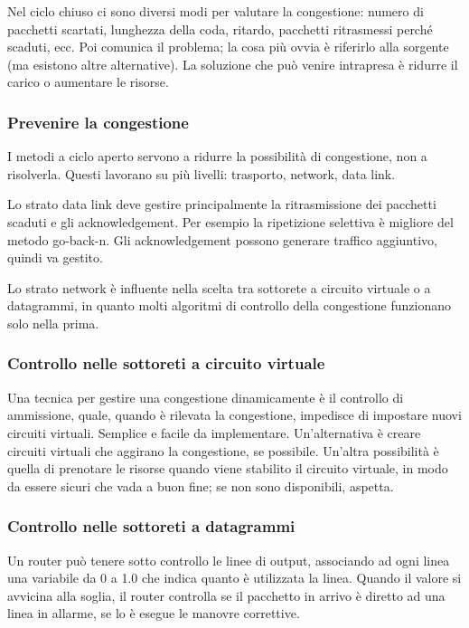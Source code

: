 Nel ciclo chiuso ci sono diversi modi per valutare la congestione: numero di pacchetti scartati, lunghezza della coda, ritardo, pacchetti ritrasmessi perché scaduti, ecc.
Poi comunica il problema; la cosa più ovvia è riferirlo alla sorgente (ma esistono altre alternative).
La soluzione che può venire intrapresa è ridurre il carico o aumentare le risorse.

\subsubsection{Prevenire la congestione}
I metodi a ciclo aperto servono a ridurre la possibilità di congestione, non a risolverla.
Questi lavorano su più livelli: trasporto, network, data link.

Lo strato data link deve gestire principalmente la ritrasmissione dei pacchetti scaduti e gli acknowledgement. 
Per esempio la ripetizione selettiva è migliore del metodo go-back-n.
Gli acknowledgement possono generare traffico aggiuntivo, quindi va gestito.

Lo strato network è influente nella scelta tra sottorete a circuito virtuale o a datagrammi, in quanto molti algoritmi di controllo della congestione funzionano solo nella prima.

\subsubsection{Controllo nelle sottoreti a circuito virtuale}
Una tecnica per gestire una congestione dinamicamente è il controllo di ammissione, quale, quando è rilevata la congestione, impedisce di impostare nuovi circuiti virtuali.
Semplice e facile da implementare.
Un'alternativa è creare circuiti virtuali che aggirano la congestione, se possibile.
Un'altra possibilità è quella di prenotare le risorse quando viene stabilito il circuito virtuale, in modo da essere sicuri che vada a buon fine;
se non sono disponibili, aspetta.

\subsubsection{Controllo nelle sottoreti a datagrammi}
Un router può tenere sotto controllo le linee di output, associando ad ogni linea una variabile da 0 a 1.0 che indica quanto è utilizzata la linea.
Quando il valore si avvicina alla soglia, il router controlla se il pacchetto in arrivo è diretto ad una linea in allarme, se lo è esegue le manovre correttive.

